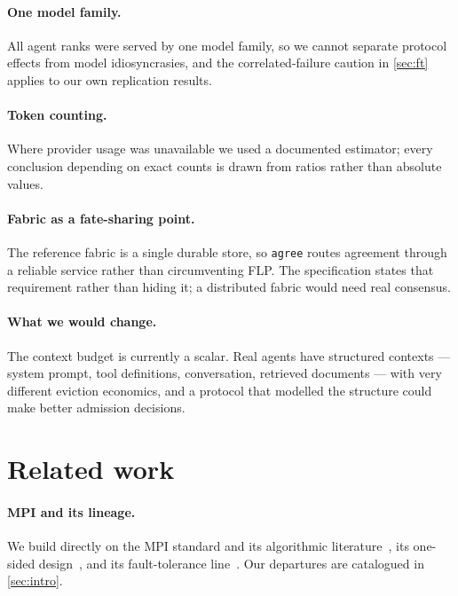 \documentclass[10pt,twocolumn]{article}
\theoremstyle{definition}
\theoremstyle{plain}
\newcommand{\code}[1]{\texttt{\small #1}}
\begin{document}
\paragraph{One model family.} All agent ranks were served by one model family, so we
cannot separate protocol effects from model idiosyncrasies, and the correlated-failure
caution in \cref{sec:ft} applies to our own replication results.

\paragraph{Token counting.} Where provider usage was unavailable we used a
documented estimator; every conclusion depending on exact counts is drawn from
ratios rather than absolute values.

\paragraph{Fabric as a fate-sharing point.} The reference fabric is a single durable
store, so \code{agree} routes agreement through a reliable service rather than
circumventing FLP. The specification states that requirement rather than hiding it;
a distributed fabric would need real consensus.

\paragraph{What we would change.} The context budget is currently a scalar. Real
agents have structured contexts --- system prompt, tool definitions, conversation,
retrieved documents --- with very different eviction economics, and a protocol that
modelled the structure could make better admission decisions.

\section{Related work}
\label{sec:related}

\paragraph{MPI and its lineage.} We build directly on the MPI standard and its
algorithmic
literature~\cite{mpiforum94,mpi31,mpi40,ThakurRabenseifnerGropp05,Chan07,Bruck97,Rabenseifner04},
its one-sided
design~\cite{hoefler15-rma,dinan16-rma,gerstenberger14}, and its fault-tolerance
line~\cite{fagg00-ftmpi,bouteiller22}. Our departures are catalogued in
\cref{sec:intro}.
\end{document}
